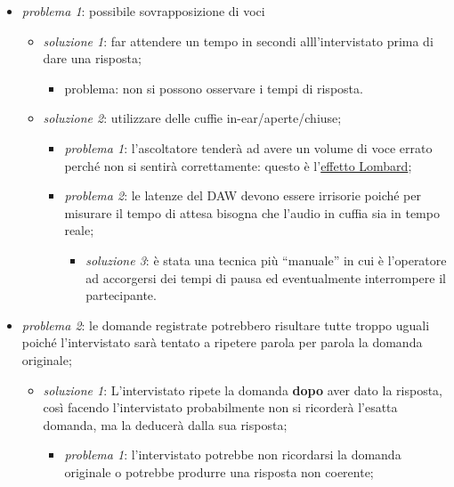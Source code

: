 \documentclass[
]{article}
\providecommand{\tightlist}{%
  \setlength{\itemsep}{0pt}\setlength{\parskip}{0pt}}
\begin{document}
\begin{itemize}
\tightlist
\item
  \emph{problema 1}: possibile sovrapposizione di voci

  \begin{itemize}
  \tightlist
  \item
    \emph{soluzione 1}: far attendere un tempo in secondi alll'intervistato prima di dare una risposta;

    \begin{itemize}
    \tightlist
    \item
      problema: non si possono osservare i tempi di risposta.
    \end{itemize}
  \item
    \emph{soluzione 2}: utilizzare delle cuffie in-ear/aperte/chiuse;

    \begin{itemize}
    \tightlist
    \item
      \emph{problema 1}: l'ascoltatore tenderà ad avere un volume di voce errato perché non si sentirà correttamente: questo è l'\hyperref[Effetto-Lombard-e-la-cuffia-nel-doppiaggio-per-una-voce-naturale]{effetto Lombard};
    \item
      \emph{problema 2}: le latenze del DAW devono essere irrisorie poiché per misurare il tempo di attesa bisogna che l'audio in cuffia sia in tempo reale;

      \begin{itemize}
      \tightlist
      \item
        \emph{soluzione 3}: è stata una tecnica più ``manuale'' in cui è l'operatore ad accorgersi dei tempi di pausa ed eventualmente interrompere il partecipante.
      \end{itemize}
    \end{itemize}
  \end{itemize}
\item
  \emph{problema 2}: le domande registrate potrebbero risultare tutte troppo uguali poiché l'intervistato sarà tentato a ripetere parola per parola la domanda originale;

  \begin{itemize}
  \tightlist
  \item
    \emph{soluzione 1}: L'intervistato ripete la domanda \textbf{dopo} aver dato la risposta, così facendo l'intervistato probabilmente non si ricorderà l'esatta domanda, ma la deducerà dalla sua risposta;

    \begin{itemize}
    \tightlist
    \item
      \emph{problema 1}: l'intervistato potrebbe non ricordarsi la domanda originale o potrebbe produrre una risposta non coerente;


\end{itemize}
\end{itemize}
\end{itemize}
\end{document}
